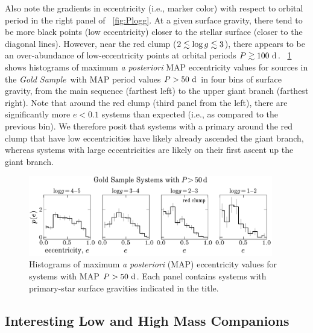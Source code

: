 \documentclass[modern]{aastex63}
\newcommand{\goldsample}{\textit{Gold Sample}}
\begin{document}
Also note the gradients in eccentricity (i.e., marker color) with respect to
orbital period in the right panel of \figurename~\ref{fig:Plogg}.
At a given surface gravity, there tend to be more black points (low
eccentricity) closer to the stellar surface (closer to the diagonal lines).
However, near the red clump ($2 \lesssim \log g \lesssim 3$), there appears to be
an over-abundance of low-eccentricity points at orbital periods $P\gtrsim
100~\mathrm{d}$.
\figurename~\ref{fig:Pe-logg-bins} shows histograms of maximum \textsl{a
posteriori} MAP eccentricity values for sources in the \goldsample\ with MAP
period values $P > 50~\mathrm{d}$ in four bins of surface gravity, from the main
sequence (farthest left) to the upper giant branch (farthest right).
Note that around the red clump (third panel from the left), there are
significantly more $e < 0.1$ systems than expected (i.e., as compared to the
previous bin).
We therefore posit that systems with a primary around the red clump that have
low eccentricities have likely already ascended the giant branch, whereas
systems with large eccentricities are likely on their first ascent up the giant
branch.

\begin{figure}[t]
    \begin{center}
    \includegraphics[width=0.95\textwidth]{P_e_logg_bins.pdf}
    \end{center}
    \caption{%
    Histograms of maximum \textsl{a posteriori} (MAP) eccentricity values for
    systems with MAP $P > 50~\mathrm{d}$.
    Each panel contains systems with primary-star surface gravities indicated in
    the title.
    \label{fig:Pe-logg-bins}
    }
\end{figure}


\subsection{Interesting Low and High Mass Companions}
\label{sec:low-high-mass}
\end{document}
